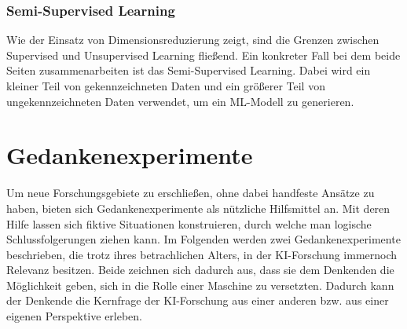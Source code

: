 \documentclass[12pt,german,ngerman]{report}
\begin{document}
    \subsection{Semi-Supervised Learning}
        Wie der Einsatz von Dimensionsreduzierung zeigt, sind die Grenzen
        zwischen Supervised und Unsupervised Learning fließend.
        Ein konkreter Fall bei dem beide Seiten zusammenarbeiten ist das Semi-Supervised Learning.
        Dabei wird ein kleiner Teil von gekennzeichneten Daten und ein größerer Teil von ungekennzeichneten Daten verwendet,
        um ein ML-Modell zu generieren.\cite{semisupervised2021mlmastery}


            

\chapter{Gedankenexperimente}
    Um neue Forschungsgebiete zu erschließen, ohne dabei handfeste Ansätze zu haben,
    bieten sich Gedankenexperimente als nützliche Hilfsmittel an.
    Mit deren Hilfe lassen sich fiktive Situationen konstruieren, durch welche man logische Schlussfolgerungen ziehen kann.
    Im Folgenden werden zwei Gedankenexperimente beschrieben, die trotz ihres betrachlichen Alters, in der KI-Forschung
    immernoch Relevanz besitzen. Beide zeichnen sich dadurch aus, dass sie dem Denkenden die Möglichkeit geben, sich in die
    Rolle einer Maschine zu versetzten. Dadurch kann der Denkende die Kernfrage der KI-Forschung aus einer anderen
    bzw. aus einer eigenen Perspektive erleben. 
\end{document}
